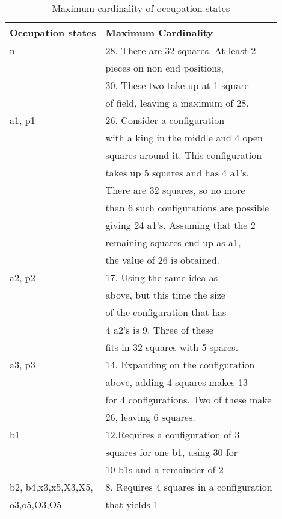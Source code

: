 \begin{table}
\caption {Maximum cardinality of  occupation states}
\begin{center}
\small
\begin{tabular}[hbt]{|l|l|} 
\hline
Occupation states & Maximum Cardinality \\
\hline
n & 28. There are 32 squares. At least 2 \\
  & pieces on non end positions,    \\
  & 30.  These two take up at 1 square \\
  & of field, leaving a maximum of 28.   \\
\hline  
a1, p1 & 26. Consider a configuration  \\
    &  with a king in the middle and 4 open \\
    & squares around  it. This configuration\\
    &  takes up 5 squares and  has 4 a1's. \\
    &  There are 32 squares, so no more \\
    & than 6 such configurations are possible \\
    & giving 24 a1's.  Assuming that the 2 \\
    & remaining  squares end up as a1, \\
    & the value of 26 is  obtained. \\
\hline  
a2, p2 & 17. Using the same idea as \\
    & above, but this time the size \\
    & of the configuration that has \\
    & 4 a2's is 9. Three of these \\
    & fits in 32 squares with 5 spares.\\
\hline    
 a3, p3 & 14.  Expanding on the configuration \\
  & above, adding 4 squares makes 13 \\
  & for 4 configurations. Two of these make \\
  & 26, leaving 6 squares.\\
\hline  
 b1 & 12.Requires a configuration of 3 \\
     & squares for one b1, using 30 for \\
     & 10 b1s and a remainder of 2\\
\hline  
b2, b4,x3,x5,X3,X5, & 8. Requires 4 squares in a configuration \\
    o3,o5,O3,O5 &  that yields 1\\

\end{tabular}
\end{center}
\end{table}
